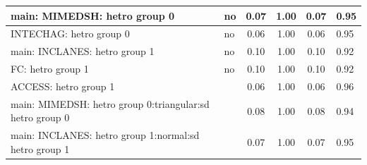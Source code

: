 \begin{table}
\begin{center}
\begin{tabular}{|l|l|c|c|c|l|}
			\hline
			main: MIMEDSH: hetro group 0 & no & 0.07 & 1.00 & 0.07 & 0.95 \\
			\hline
			INTECHAG: hetro group 0 & no & 0.06 & 1.00 & 0.06 & 0.95 \\
			\hline
			main: INCLANES: hetro group 1 & no & 0.10 & 1.00 & 0.10 & 0.92 \\
			\hline
			FC: hetro group 1 & no & 0.10 & 1.00 & 0.10 & 0.92 \\
			\hline
			ACCESS: hetro group 1 &  & 0.06 & 1.00 & 0.06 & 0.96 \\
			\hline
			main: MIMEDSH: hetro group 0:triangular:sd  hetro group 0 &  & 0.08 & 1.00 & 0.08 & 0.94 \\
			\hline
			main: INCLANES: hetro group 1:normal:sd  hetro group 1 &  & 0.07 & 1.00 & 0.07 & 0.95 \\
			\hline
		\end{tabular}
	\end{center}
\end{table}